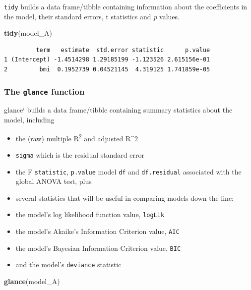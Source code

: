 \documentclass[]{book}
\newenvironment{Shaded}{\begin{snugshade}}{\end{snugshade}}
\newcommand{\KeywordTok}[1]{\textcolor[rgb]{0.13,0.29,0.53}{\textbf{#1}}}
\newcommand{\NormalTok}[1]{#1}
\providecommand{\tightlist}{%
  \setlength{\itemsep}{0pt}\setlength{\parskip}{0pt}}
\theoremstyle{definition}
\theoremstyle{definition}
\theoremstyle{definition}
\theoremstyle{remark}
\begin{document}
\texttt{tidy} builds a data frame/tibble containing information about
the coefficients in the model, their standard errors, t statistics and
\emph{p} values.

\begin{Shaded}
\begin{Highlighting}[]
\KeywordTok{tidy}\NormalTok{(model_A)}
\end{Highlighting}
\end{Shaded}

\begin{verbatim}
         term   estimate  std.error statistic      p.value
1 (Intercept) -1.4514298 1.29185199 -1.123526 2.615156e-01
2         bmi  0.1952739 0.04521145  4.319125 1.741859e-05
\end{verbatim}

\subsubsection{\texorpdfstring{The \texttt{glance}
function}{The glance function}}\label{the-glance-function}

glance` builds a data frame/tibble containing summary statistics about
the model, including

\begin{itemize}
\tightlist
\item
  the (raw) multiple R\textsuperscript{2} and adjusted R\^{}2
\item
  \texttt{sigma} which is the residual standard error
\item
  the F \texttt{statistic}, \texttt{p.value} model \texttt{df} and
  \texttt{df.residual} associated with the global ANOVA test, plus
\item
  several statistics that will be useful in comparing models down the
  line:
\item
  the model's log likelihood function value, \texttt{logLik}
\item
  the model's Akaike's Information Criterion value, \texttt{AIC}
\item
  the model's Bayesian Information Criterion value, \texttt{BIC}
\item
  and the model's \texttt{deviance} statistic
\end{itemize}

\begin{Shaded}
\begin{Highlighting}[]
\KeywordTok{glance}\NormalTok{(model_A)}
\end{Highlighting}
\end{Shaded}
\end{document}
